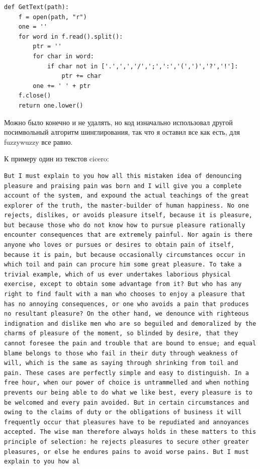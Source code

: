 \begin{lstlisting}
def GetText(path):
    f = open(path, "r")
    one = ''
    for word in f.read().split():
        ptr = ''
        for char in word:
            if char not in ['.',',','/',';',':','(',')','?','!']:
                ptr += char
        one += ' ' + ptr
    f.close()
    return one.lower()
\end{lstlisting}

Можно было конечно и не удалять, но код изначально использовал другой посимвольный алгоритм шинглирования, так что я оставил все как есть, для fuzzywuzzy все равно.

К примеру один из текстов cicero:

\begin{lstlisting}
But I must explain to you how all this mistaken idea of denouncing pleasure and praising pain was born and I will give you a complete account of the system, and expound the actual teachings of the great explorer of the truth, the master-builder of human happiness. No one rejects, dislikes, or avoids pleasure itself, because it is pleasure, but because those who do not know how to pursue pleasure rationally encounter consequences that are extremely painful. Nor again is there anyone who loves or pursues or desires to obtain pain of itself, because it is pain, but because occasionally circumstances occur in which toil and pain can procure him some great pleasure. To take a trivial example, which of us ever undertakes laborious physical exercise, except to obtain some advantage from it? But who has any right to find fault with a man who chooses to enjoy a pleasure that has no annoying consequences, or one who avoids a pain that produces no resultant pleasure? On the other hand, we denounce with righteous indignation and dislike men who are so beguiled and demoralized by the charms of pleasure of the moment, so blinded by desire, that they cannot foresee the pain and trouble that are bound to ensue; and equal blame belongs to those who fail in their duty through weakness of will, which is the same as saying through shrinking from toil and pain. These cases are perfectly simple and easy to distinguish. In a free hour, when our power of choice is untrammelled and when nothing prevents our being able to do what we like best, every pleasure is to be welcomed and every pain avoided. But in certain circumstances and owing to the claims of duty or the obligations of business it will frequently occur that pleasures have to be repudiated and annoyances accepted. The wise man therefore always holds in these matters to this principle of selection: he rejects pleasures to secure other greater pleasures, or else he endures pains to avoid worse pains. But I must explain to you how al
\end{lstlisting}


